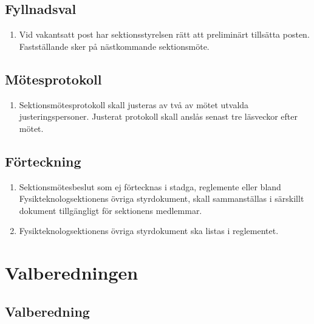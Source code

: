 \documentclass[11pt,a4paper]{article}
\begin{document}
\subsection{Fyllnadsval}

\begin{enumerate}[\thesubsection .1]

  \item Vid vakantsatt post har sektions\-styr\-elsen rätt att preliminärt tillsätta posten. Fastställande sker på näst\-komm\-ande sektionsmöte.

\end{enumerate}

\subsection{Mötesprotokoll}

\begin{enumerate}[\thesubsection .1]

  \item Sektionsmötesprotokoll skall justeras av två av mötet utvalda
  justeringspersoner. Justerat protokoll skall anslås senast tre
  läsveckor efter mötet.

\end{enumerate}


\subsection{Förteckning}

\begin{enumerate}[\thesubsection .1]

  \item Sektionsmötesbeslut som ej förtecknas i stadga, reglemente eller bland Fysikteknologsektionens övriga styrdokument, skall sammanställas i särskillt dokument tillgängligt för sektionens medlemmar.

\item Fysikteknologsektionens övriga styrdokument ska listas i reglementet.
\end{enumerate}

\newpage




\section{Valberedningen}

\subsection{Valberedning}
\end{document}
